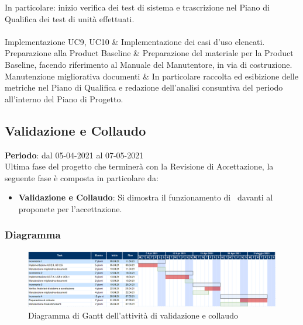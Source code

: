 \begin{longtabu}
						In particolare: inizio verifica dei test di sistema e trascrizione nel Piano di Qualifica dei test di unità effettuati. \\
					\hline
					 \\
					\hline
						Implementazione UC9, UC10 & 
						Implementazione dei casi d'uso elencati.\\
					\hline
						Preparazione alla Product Baseline & 
						Preparazione del materiale per la Product Baseline, facendo riferimento al Manuale del Manutentore, in via di costruzione.\\
					\hline
						Manutenzione migliorativa documenti & 
						In particolare raccolta ed esibizione delle metriche nel Piano di Qualifica e redazione dell'analisi consuntiva del periodo all'interno del Piano di Progetto. \\
					\hline
    		\end{longtabu}

	\subsection{Validazione e Collaudo}
	\textbf{Periodo}: dal 05-04-2021 al 07-05-2021 \\
	Ultima fase del progetto che terminerà con la Revisione di Accettazione, la seguente fase è composta in particolare da:
	\begin{itemize}
		\item \textbf{Validazione e Collaudo}: Si dimostra il funzionamento di \hd\ davanti al proponete per l'accettazione.
	\end{itemize}
	
	\subsubsection{Diagramma}
		\begin{figure}[H]
        		\centering
        		\includegraphics[width=\textwidth]{source/img/Validazione_collaudo.png}
        		\caption{Diagramma di Gantt dell'attività di validazione e collaudo}
    		\end{figure}
